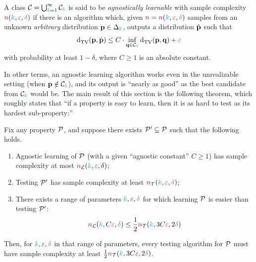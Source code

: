 \begin{definition}
	A class $\mathcal{C}=\bigcup_{{\textcolor{cyan}{k}}=1}^\infty \mathcal{C}_{\textcolor{cyan}{k}}$ is said to be \emph{agnostically learnable} with sample complexity $\ns(\ab,\dst,\errprob)$ if there is an algorithm which, given $\ns=\ns(\ab,\dst,\errprob)$ \iid samples from an unknown \emph{arbitrary} distribution $\mathbf{p}\in\Delta_{{\textcolor{cyan}{k}}}$, outputs a distribution $\hat{\mathbf{p}}$ such that
	\[
		\totalvardist{\p}{\hat{\p}} \leq C\cdot \inf_{\q\in\class_\ab} \totalvardist{\p}{\q} + \dst
	\]
with probability at least $1-\delta$, where $C\geq 1$ is an absolute constant.
\end{definition}
In other terms, an agnostic learning algorithm works even in the unrealizable setting (when $\mathbf{p}\notin\mathcal{C}_{\textcolor{cyan}{k}}$), and its output is ``nearly as good'' as the best candidate from $\mathcal{C}_{\textcolor{cyan}{k}}$ would be. The main result of this section is the following theorem, which roughly states that ``if a property is easy to learn, then it is as hard to test as its hardest sub-property:''
\begin{theorem}\label{theo:hardness:subclass}
  Fix any property $\mathcal{P}$, and suppose there exists $\mathcal{P}'\subseteq \mathcal{P}$ such that the following holds.
  \begin{enumerate}
    \item\label{theo:hardness:subclass:item1} Agnostic learning of $\mathcal{P}$ (with a given ``agnostic constant'' $C\geq 1$) has sample complexity at most ${\textcolor{purple}{n}}_{\mathcal{L}}({\textcolor{cyan}{k}},\textcolor{red}{\varepsilon},\delta)$;
    \item\label{theo:hardness:subclass:item2} Testing $\mathcal{P}'$ has sample complexity at least $\ns_{\mathcal{T}}(\ab,\dst,\errprob)$;
    \item\label{theo:hardness:subclass:item3} There exists a range of parameters $\ab,\dst,\errprob$ for which learning $\mathcal{P}$ is easier than testing $\mathcal{P}'$: 
    	\[
    		\ns_{\mathcal{L}}(\ab,C\dst,\errprob) \leq \frac{1}{2}\ns_{\mathcal{T}}(\ab,3C\dst,2\errprob)
    	\]
  \end{enumerate}
  Then, for $\ab,\dst,\errprob$ in that range of parameters, every testing algorithm for $\mathcal{P}$ must have sample complexity at least $\frac{1}{2}\ns_{\mathcal{T}}(\ab,3C\dst,2\errprob)$.
\end{theorem}
